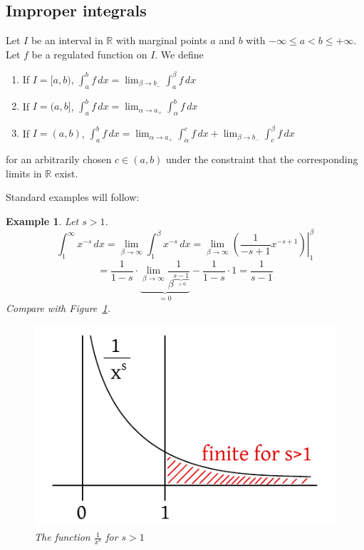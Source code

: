 \documentclass{article}
\newtheorem{example}{Example}  \numberwithin{example}{section}
\begin{document}
\subsection{Improper integrals}

Let $I$ be an interval in $\mathbb R$ with marginal points $a$ and $b$ with $-\infty \leq a < b \leq +\infty$.
Let $f$ be a regulated function on $I$.
We define
\begin{enumerate}
  \item If $I = [a,b)$, $\int_a^b f \, dx = \lim_{\beta \to b_-} \int_a^\beta f \, dx$
  \item If $I = (a,b]$, $\int_a^b f \, dx = \lim_{\alpha \to a_+} \int_\alpha^b f \, dx$
  \item If $I = (a,b)$, $\int_a^b f \, dx = \lim_{\alpha \to a_+} \int_\alpha^c f \, dx + \lim_{\beta \to b_-} \int_c^\beta f \, dx$
\end{enumerate}
for an arbitrarily chosen $c \in (a,b)$ under the constraint that the corresponding limits in $\mathbb R$ exist.

Standard examples will follow:
\begin{example}
  Let $s > 1$.
  \[ \int_1^\infty x^{-s} \, dx = \lim_{\beta \to \infty} \int_1^\beta x^{-s} \, dx = \left.\lim_{\beta \to \infty} \left(\frac{1}{-s + 1} x^{-s+1}\right) \right|_1^\beta \]
  \[ = \frac1{1 - s} \cdot \underbrace{\lim_{\beta \to \infty} \frac{1}{\beta^{\underbrace{s-1}_{> 0}}}}_{= 0} - \frac{1}{1 - s} \cdot 1 = \frac{1}{s-1} \]
  Compare with Figure~\ref{img:xs}.
  \begin{figure}[t]
    \begin{center}
      \includegraphics{img/21b_1_by_xs.pdf}
      \caption{The function $\frac{1}{x^s}$ for $s > 1$}
      \label{img:xs}
    \end{center}
  \end{figure}
\end{example}
\end{document}
